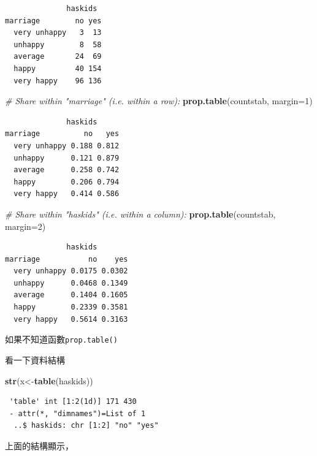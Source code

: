 \documentclass[]{book}
\newenvironment{Shaded}{\begin{snugshade}}{\end{snugshade}}
\newcommand{\CommentTok}[1]{\textcolor[rgb]{0.56,0.35,0.01}{\textit{#1}}}
\newcommand{\DataTypeTok}[1]{\textcolor[rgb]{0.13,0.29,0.53}{#1}}
\newcommand{\DecValTok}[1]{\textcolor[rgb]{0.00,0.00,0.81}{#1}}
\newcommand{\KeywordTok}[1]{\textcolor[rgb]{0.13,0.29,0.53}{\textbf{#1}}}
\newcommand{\NormalTok}[1]{#1}
\theoremstyle{definition}
\theoremstyle{definition}
\theoremstyle{definition}
\theoremstyle{remark}
\begin{document}
\begin{verbatim}
              haskids
marriage        no yes
  very unhappy   3  13
  unhappy        8  58
  average       24  69
  happy         40 154
  very happy    96 136
\end{verbatim}

\begin{Shaded}
\begin{Highlighting}[]
\CommentTok{# Share within "marriage" (i.e. within a row):}
\KeywordTok{prop.table}\NormalTok{(countstab, }\DataTypeTok{margin=}\DecValTok{1}\NormalTok{)}
\end{Highlighting}
\end{Shaded}

\begin{verbatim}
              haskids
marriage          no   yes
  very unhappy 0.188 0.812
  unhappy      0.121 0.879
  average      0.258 0.742
  happy        0.206 0.794
  very happy   0.414 0.586
\end{verbatim}

\begin{Shaded}
\begin{Highlighting}[]
\CommentTok{# Share within "haskids"  (i.e. within a column):}
\KeywordTok{prop.table}\NormalTok{(countstab, }\DataTypeTok{margin=}\DecValTok{2}\NormalTok{)}
\end{Highlighting}
\end{Shaded}

\begin{verbatim}
              haskids
marriage           no    yes
  very unhappy 0.0175 0.0302
  unhappy      0.0468 0.1349
  average      0.1404 0.1605
  happy        0.2339 0.3581
  very happy   0.5614 0.3163
\end{verbatim}

如果不知道函數\texttt{prop.table()}

看一下資料結構

\begin{Shaded}
\begin{Highlighting}[]
\KeywordTok{str}\NormalTok{(x<-}\KeywordTok{table}\NormalTok{(haskids))}
\end{Highlighting}
\end{Shaded}

\begin{verbatim}
 'table' int [1:2(1d)] 171 430
 - attr(*, "dimnames")=List of 1
  ..$ haskids: chr [1:2] "no" "yes"
\end{verbatim}

上面的結構顯示，
\end{document}
